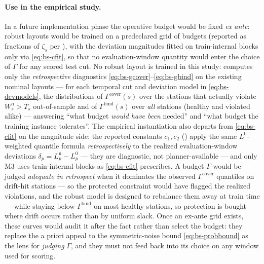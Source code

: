 \paragraph{Use in the empirical study.}
In a future implementation phase the operative budget would be fixed
\emph{ex ante}: robust layouts would be trained on a predeclared grid of
budgets (reported as fractions of $\zeta_s$ per ), with
the deviation magnitudes fitted on train-internal blocks only via
\eqref{eq:bs-cfit}, so that no evaluation-window quantity would enter the
choice of $\Gamma$ for any scored test cut. No robust layout is trained in
this study:  computes only the \emph{retrospective}
diagnostics \eqref{eq:bs-gcover}--\eqref{eq:bs-gbind} on the existing
nominal layouts --- for each temporal cut and deviation model in
\eqref{eq:bs-devmodels}, the distributions of $\Gamma^{\mathrm{cover}}(s)$
over the stations that actually violate $W^{\mathrm n}_s > T_s$
out-of-sample and of $\Gamma^{\mathrm{bind}}(s)$ over \emph{all} stations
(healthy and violated alike) --- answering ``what budget \emph{would have
been} needed'' and ``what budget the training instance tolerates''. The
empirical instantiation also departs from \eqref{eq:bs-cfit} on the
magnitude side: the reported constants $c_1, c_2$ () apply
the same $L^0$-weighted quantile formula \emph{retrospectively} to the
realized evaluation-window deviations
$\delta_p = L^{\mathrm n}_p - L^0_p$ --- they are diagnostic, not
planner-available --- and only M3 uses train-internal blocks as
\eqref{eq:bs-cfit} prescribes. A budget $\Gamma$ would be judged
\emph{adequate in retrospect} when it dominates the observed
$\Gamma^{\mathrm{cover}}$ quantiles on drift-hit stations --- so the
protected constraint would have flagged the realized violations, and the
robust model is designed to rebalance them away at train time --- while
staying below $\Gamma^{\mathrm{bind}}$ on most healthy stations, so
protection is bought where drift occurs rather than by uniform slack. Once
an ex-ante grid exists, these curves would audit it after the fact rather
than select the budget: they replace the a priori appeal to the
symmetric-noise bound \eqref{eq:bs-probbound} as the lens for \emph{judging}
$\Gamma$, and they must not feed back into its choice on any window used
for scoring.
